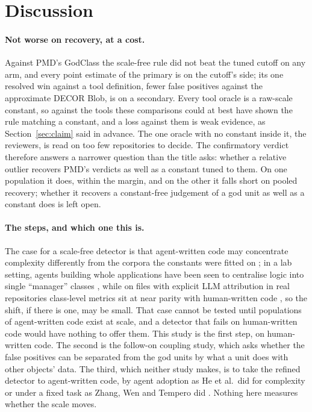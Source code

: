 \documentclass[11pt,a4paper]{article}
\begin{document}
\section{Discussion}
\label{sec:disc}

\paragraph{Not worse on recovery, at a cost.} Against PMD's GodClass the
scale-free rule did not beat the tuned cutoff on any arm, and every point
estimate of the primary is on the cutoff's side; its one resolved win against
a tool definition, fewer false positives against the approximate DECOR Blob,
is on a secondary. Every tool oracle is a raw-scale constant, so against the
tools these comparisons could at best have shown the rule matching a
constant, and a loss against them is weak evidence, as
Section~\ref{sec:claim} said in advance. The one oracle with no constant
inside it, the reviewers, is read on too few repositories to decide. The
confirmatory verdict therefore answers a narrower question than the title
asks: whether a relative outlier recovers PMD's verdicts as well as a
constant tuned to them. On one population it does, within the margin, and on
the other it falls short on pooled recovery; whether it recovers a
constant-free judgement of a god unit as well as a constant does is left
open.

\paragraph{The steps, and which one this is.} The case for a scale-free
detector is that agent-written code may concentrate complexity differently
from the corpora the constants were fitted on \cite{he2026cursor,
zhang2026llm}; in a lab setting, agents building whole applications have been
seen to centralise logic into single ``manager'' classes \cite{zhu2026smells},
while on files with explicit LLM attribution in real repositories
class-level metrics sit at near parity with human-written code
\cite{mao2026measurement}, so the shift, if there is one, may be small. That
case cannot be tested until populations of agent-written code exist at
scale, and a detector that fails on human-written code would have nothing to
offer them. This study is the first step, on human-written code. The second
is the follow-on coupling study, which asks whether the false positives can
be separated from the god units by what a unit does with other objects'
data. The third, which neither study makes, is to take the refined detector
to agent-written code, by agent adoption as He et al.\ did for complexity
\cite{he2026cursor} or under a fixed task as Zhang, Wen and Tempero did
\cite{zhang2026llm}. Nothing here measures whether the scale moves.
\end{document}
